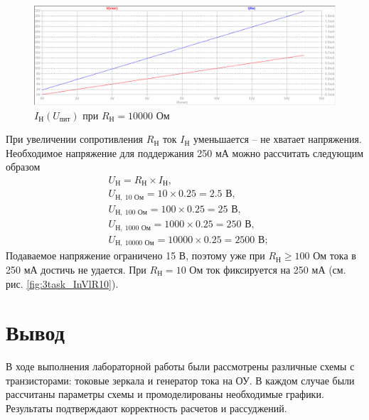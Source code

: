 \documentclass[a4paper, 12pt]{article}
\begin{document}
    \begin{figure}[H]
        \centering
        \includegraphics[scale=0.46]{3task_Iн(Vпит)_Rн10000.png}
        \captionsetup{skip=0pt}
        \caption{$I_\text{Н}\left( U_\text{пит} \right)$ при $R_\text{Н}=10000$ Ом}
        \label{fig:3task_InVlR10000}
    \end{figure}
    \noindent При увеличении сопротивления $R_\text{Н}$ ток $I_\text{Н}$ уменьшается
    -- не хватает напряжения. Необходимое напряжение для поддержания 250 мА можно рассчитать
    следующим образом
    \begin{align*}
        &U_\text{Н}=R_\text{Н}\times I_\text{Н},\\
        &U_{\text{Н},\ 10\text{ Ом}}=10\times 0.25=2.5\text{ В},\\
        &U_{\text{Н},\ 100\text{ Ом}}=100\times 0.25=25\text{ В},\\
        &U_{\text{Н},\ 1000\text{ Ом}}=1000\times 0.25=250\text{ В},\\
        &U_{\text{Н},\ 10000\text{ Ом}}=10000\times 0.25=2500\text{ В};
    \end{align*}
    Подаваемое напряжение ограничено 15 В, поэтому уже при $R_\text{Н}\geq100$ Ом тока в 250 мА
    достичь не удается. При $R_\text{Н}=10$ Ом ток фиксируется на 250 мА (см. рис. \ref{fig:3task_InVlR10}).


    \section{Вывод}
    В ходе выполнения лабораторной работы были рассмотрены
    различные схемы с транзисторами: токовые зеркала и генератор тока на ОУ.
    В каждом случае были рассчитаны параметры схемы и промоделированы
    необходимые графики. Результаты подтверждают корректность расчетов и рассуджений.
\end{document}
